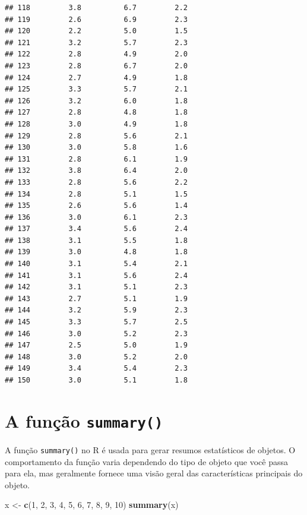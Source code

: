 \documentclass[
]{book}
\newenvironment{Shaded}{\begin{snugshade}}{\end{snugshade}}
\newcommand{\DecValTok}[1]{\textcolor[rgb]{0.00,0.00,0.81}{#1}}
\newcommand{\FunctionTok}[1]{\textcolor[rgb]{0.13,0.29,0.53}{\textbf{#1}}}
\newcommand{\NormalTok}[1]{#1}
\newcommand{\OtherTok}[1]{\textcolor[rgb]{0.56,0.35,0.01}{#1}}
\theoremstyle{definition}
\theoremstyle{definition}
\theoremstyle{definition}
\theoremstyle{definition}
\theoremstyle{remark}
\begin{document}
\begin{verbatim}
## 118         3.8          6.7         2.2
## 119         2.6          6.9         2.3
## 120         2.2          5.0         1.5
## 121         3.2          5.7         2.3
## 122         2.8          4.9         2.0
## 123         2.8          6.7         2.0
## 124         2.7          4.9         1.8
## 125         3.3          5.7         2.1
## 126         3.2          6.0         1.8
## 127         2.8          4.8         1.8
## 128         3.0          4.9         1.8
## 129         2.8          5.6         2.1
## 130         3.0          5.8         1.6
## 131         2.8          6.1         1.9
## 132         3.8          6.4         2.0
## 133         2.8          5.6         2.2
## 134         2.8          5.1         1.5
## 135         2.6          5.6         1.4
## 136         3.0          6.1         2.3
## 137         3.4          5.6         2.4
## 138         3.1          5.5         1.8
## 139         3.0          4.8         1.8
## 140         3.1          5.4         2.1
## 141         3.1          5.6         2.4
## 142         3.1          5.1         2.3
## 143         2.7          5.1         1.9
## 144         3.2          5.9         2.3
## 145         3.3          5.7         2.5
## 146         3.0          5.2         2.3
## 147         2.5          5.0         1.9
## 148         3.0          5.2         2.0
## 149         3.4          5.4         2.3
## 150         3.0          5.1         1.8
\end{verbatim}

\section{\texorpdfstring{A função \texttt{summary()}}{A função summary()}}\label{a-funuxe7uxe3o-summary}

A função \texttt{summary()} no R é usada para gerar resumos estatísticos de objetos. O comportamento da função varia dependendo do tipo de objeto que você passa para ela, mas geralmente fornece uma visão geral das características principais do objeto.

\begin{Shaded}
\begin{Highlighting}[]
\NormalTok{x }\OtherTok{\textless{}{-}} \FunctionTok{c}\NormalTok{(}\DecValTok{1}\NormalTok{, }\DecValTok{2}\NormalTok{, }\DecValTok{3}\NormalTok{, }\DecValTok{4}\NormalTok{, }\DecValTok{5}\NormalTok{, }\DecValTok{6}\NormalTok{, }\DecValTok{7}\NormalTok{, }\DecValTok{8}\NormalTok{, }\DecValTok{9}\NormalTok{, }\DecValTok{10}\NormalTok{)}
\FunctionTok{summary}\NormalTok{(x)  }
\end{Highlighting}
\end{Shaded}
\end{document}
